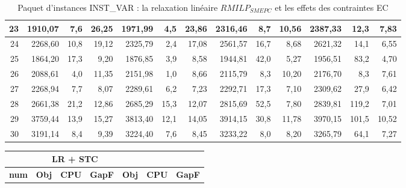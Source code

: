 {\begin{table}[H]
\begin{tabular}{|r|rrr|rrr|rrr|rrr|}
		23	&	1910,07	&	7,6	&	26,25	&	1971,99	&	4,5	&	23,86	&	2316,46	&	8,7	&	10,56	&	2387,33	&	12,3	&	7,83	\\ \hline
		24	&	2268,60	&	10,8	&	19,12	&	2325,79	&	2,4	&	17,08	&	2561,57	&	16,7	&	8,68	&	2621,32	&	14,1	&	6,55	\\ \hline
		25	&	1864,20	&	17,3	&	9,20	&	1876,85	&	3,9	&	8,58	&	1944,81	&	42,0	&	5,27	&	1956,51	&	83,2	&	4,70	\\ \hline
		26	&	2088,61	&	4,0	&	11,35	&	2151,98	&	1,0	&	8,66	&	2115,79	&	8,3	&	10,20	&	2176,70	&	8,3	&	7,61	\\ \hline
		27	&	2268,94	&	7,7	&	8,07	&	2289,61	&	6,2	&	7,23	&	2292,71	&	17,3	&	7,10	&	2309,62	&	27,9	&	6,42	\\ \hline
		28	&	2661,38	&	21,2	&	12,86	&	2685,29	&	15,3	&	12,07	&	2815,69	&	52,5	&	7,80	&	2839,81	&	119,2	&	7,01	\\ \hline
		29	&	3759,44	&	13,9	&	15,27	&	3813,40	&	12,1	&	14,05	&	3914,15	&	30,8	&	11,78	&	3970,15	&	101,5	&	10,52	\\ \hline
		30	&	3191,14	&	8,4	&	9,39	&	3224,40	&	7,6	&	8,45	&	3233,22	&	8,0	&	8,20	&	3265,79	&	64,1	&	7,27	\\ \hline
		
		\bottomrule
	\end{tabular}%
	\caption[Impact des contraintes EC sur les résultats de \textit{$RMILP_{SMEPC}$} sur INST\_VAR]{Paquet d'instances INST\_VAR : la relaxation linéaire \textit{$RMILP_{SMEPC}$} et les effets des contraintes EC}
	
	\label{tab:frac2}%
\end{table}%


\begin{table}[H]
	\centering
	\small
	\begin{tabular}{|r|rrr|rrr|}
		\hline
		\toprule
		\rowcolor{cyan}	\multicolumn{4}{c}{\textbf{LR}}              & \multicolumn{3}{c}{\textbf{LR + STC}} \\ \hline
		\midrule
		\rowcolor{cyan}	\textbf{num} & \textbf{Obj} & \textbf{CPU} & \textbf{GapF} & \multicolumn{1}{r}{ \textbf{Obj}} & \textbf{CPU} & \textbf{GapF} \\ \hline
		\midrule
		

\end{tabular}
\end{table}}
